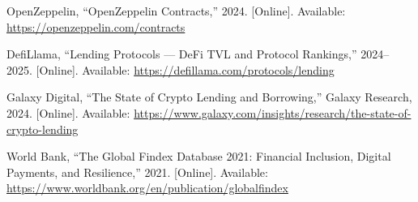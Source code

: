 \documentclass[11pt,a4paper]{article}
\begin{document}
{\begin{enumerate}[label={[\arabic*]}]
\item OpenZeppelin, ``OpenZeppelin Contracts,'' 2024. [Online]. Available: \url{https://openzeppelin.com/contracts}
\item DefiLlama, ``Lending Protocols — DeFi TVL and Protocol Rankings,'' 2024--2025. [Online]. Available: \url{https://defillama.com/protocols/lending}
\item Galaxy Digital, ``The State of Crypto Lending and Borrowing,'' Galaxy Research, 2024. [Online]. Available: \url{https://www.galaxy.com/insights/research/the-state-of-crypto-lending}
\item World Bank, ``The Global Findex Database 2021: Financial Inclusion, Digital Payments, and Resilience,'' 2021. [Online]. Available: \url{https://www.worldbank.org/en/publication/globalfindex}
\end{enumerate}
}
\end{document}
